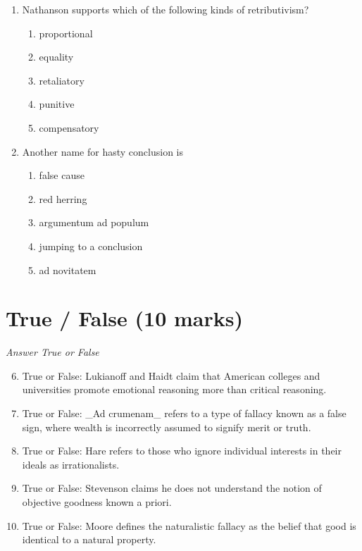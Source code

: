 \documentclass[12pt]{article}
\begin{document}
\begin{enumerate}[label=\arabic*.]
\begin{enumerate}[label=(\alph*)]
\end{enumerate}
\item Nathanson supports which of the following kinds of retributivism?
\begin{enumerate}[label=(\alph*)]
    \item proportional
    \item equality
    \item retaliatory
    \item punitive
    \item compensatory
\end{enumerate}
\item Another name for hasty conclusion is
\begin{enumerate}[label=(\alph*)]
    \item false cause
    \item red herring
    \item argumentum ad populum
    \item jumping to a conclusion
    \item ad novitatem
\end{enumerate}
\end{enumerate}

\section*{True / False (10 marks)}
\textit{Answer True or False}
\begin{enumerate}[label=\arabic*.]
\setcounter{enumi}{5}
\item True or False: Lukianoff and Haidt claim that American colleges and universities promote emotional reasoning more than critical reasoning.
\item True or False: \_Ad crumenam\_ refers to a type of fallacy known as a false sign, where wealth is incorrectly assumed to signify merit or truth.
\item True or False: Hare refers to those who ignore individual interests in their ideals as irrationalists.
\item True or False: Stevenson claims he does not understand the notion of objective goodness known a priori.
\item True or False: Moore defines the naturalistic fallacy as the belief that good is identical to a natural property.
\end{enumerate}
\end{document}

